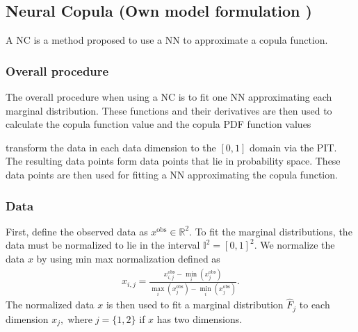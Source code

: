 \subsection{Neural Copula (Own model formulation )} 
A \gls{NC} is a method proposed to use a \gls{NN} to approximate a copula function. 


\subsubsection{Overall procedure}
The overall procedure when using a \gls{NC} is to fit one \gls{NN} approximating each marginal distribution. These functions and their derivatives are then used to calculate the copula function value and the copula \gls{PDF} function values 

transform the data in each data dimension to the $[0,1]$ domain via the \gls{PIT}. The resulting data points form data points that lie in probability space. These data points are then used for fitting a \gls{NN} approximating the copula function. 


\subsubsection{Data }
First, define the observed data as $x^{\mathrm{obs}}\in \mathbb{R}^2 $. To fit the marginal distributions, the data must be normalized to lie in the interval $\mathbb{I}^2 = [0,1]^2$. We normalize the data $x$ by using min max normalization defined as
\begin{align*}
    x_{i,j} = \frac{x_{i,j}^{\mathrm{obs}} - \min_i(x_{j}^{\mathrm{obs}})}{  \max_i(x_{j}^{\mathrm{obs}})- \min_i(x_{j}^{\mathrm{obs}})}.
\end{align*}
The normalized data $x$ is then used to fit a marginal distribution $\hat{F}_j$ to each dimension $x_j, \; \mathrm{where} \; j=\{1,2\}$ if $x$ has two dimensions. 


